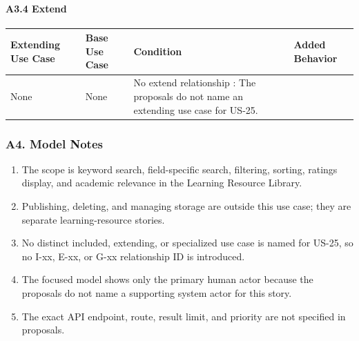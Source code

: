 \documentclass[12pt]{article}
\renewcommand{\baselinestretch}{1.5}
\begin{document}
\hypertarget{sec:a3-4-extend}{}
\paragraph*{A3.4 Extend}
\par\medskip

\begingroup
\small
\renewcommand{\baselinestretch}{1.0}\selectfont
\renewcommand{\arraystretch}{1.15}
\setlength{\tabcolsep}{6pt}
\begin{longtable}{|>{\raggedright\arraybackslash}p{}|>{\raggedright\arraybackslash}p{}|>{\raggedright\arraybackslash}p{}|>{\raggedright\arraybackslash}p{}|}
\hline
\textbf{Extending Use Case} & \textbf{Base Use Case} & \textbf{Condition} & \textbf{Added Behavior} \\ \hline
\endhead
None & None & No extend relationship : The proposals do not name an extending use case for US-25. \\ \hline
\end{longtable}
\endgroup
\par\medskip

\hypertarget{sec:a4-model-notes}{}
\subsubsection*{A4. Model Notes}
\par\medskip

\begin{enumerate}
\item The scope is keyword search, field-specific search, filtering, sorting, ratings display, and academic relevance in the Learning Resource Library.
\item Publishing, deleting, and managing storage are outside this use case; they are separate learning-resource stories.
\item No distinct included, extending, or specialized use case is named for US-25, so no I-xx, E-xx, or G-xx relationship ID is introduced.
\item The focused model shows only the primary human actor because the proposals do not name a supporting system actor for this story.
\item The exact API endpoint, route, result limit, and priority are not specified in proposals.
\end{enumerate}
\par\medskip

\hypertarget{sec:part-b-use-case-specification}{}
\end{document}
